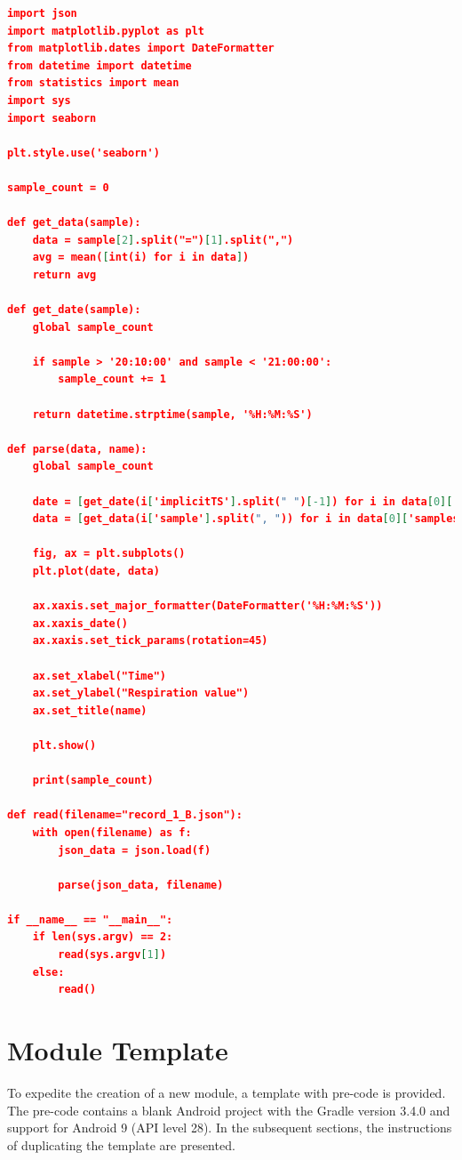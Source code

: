 \begin{lstlisting}[language=json, caption={}, captionpos=b]
import json
import matplotlib.pyplot as plt
from matplotlib.dates import DateFormatter
from datetime import datetime
from statistics import mean
import sys 
import seaborn

plt.style.use('seaborn')

sample_count = 0

def get_data(sample):
    data = sample[2].split("=")[1].split(",")
    avg = mean([int(i) for i in data])
    return avg

def get_date(sample):
    global sample_count

    if sample > '20:10:00' and sample < '21:00:00':
        sample_count += 1

    return datetime.strptime(sample, '%H:%M:%S')

def parse(data, name):
    global sample_count

    date = [get_date(i['implicitTS'].split(" ")[-1]) for i in data[0]['samples']]
    data = [get_data(i['sample'].split(", ")) for i in data[0]['samples']]

    fig, ax = plt.subplots()
    plt.plot(date, data)

    ax.xaxis.set_major_formatter(DateFormatter('%H:%M:%S'))
    ax.xaxis_date()
    ax.xaxis.set_tick_params(rotation=45)

    ax.set_xlabel("Time")
    ax.set_ylabel("Respiration value")
    ax.set_title(name)

    plt.show()
    
    print(sample_count)

def read(filename="record_1_B.json"):
    with open(filename) as f:
        json_data = json.load(f)

        parse(json_data, filename)

if __name__ == "__main__":
    if len(sys.argv) == 2:
        read(sys.argv[1])
    else:
        read()
\end{lstlisting}


\chapter{Module Template}
To expedite the creation of a new module, a template with pre-code is provided. The pre-code contains a blank Android project with the Gradle version 3.4.0 and support for Android 9 (API level 28). In the subsequent sections, the instructions of duplicating the template are presented. 


